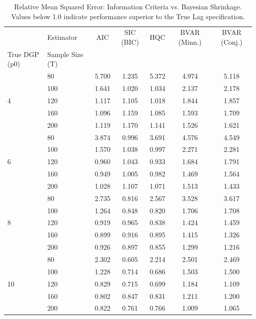 \begin{table}[htbp]
\centering
\caption{Relative Mean Squared Error: Information Criteria vs. Bayesian Shrinkage. Values below 1.0 indicate performance superior to the True Lag specification.}
\label{tab:bvar_vs_ic}
\begin{tabular}{llccccc}
\toprule
 & Estimator & AIC & SIC (BIC) & HQC & BVAR (Minn.) & BVAR (Conj.) \\
True DGP (p0) & Sample Size (T) &  &  &  &  &  \\
\midrule
\multirow[t]{5}{*}{4} & 80 & 5.700 & 1.235 & 5.372 & 4.974 & 5.118 \\
 & 100 & 1.641 & 1.020 & 1.034 & 2.137 & 2.178 \\
 & 120 & 1.117 & 1.105 & 1.018 & 1.844 & 1.857 \\
 & 160 & 1.096 & 1.159 & 1.085 & 1.593 & 1.709 \\
 & 200 & 1.119 & 1.170 & 1.141 & 1.526 & 1.621 \\
\multirow[t]{5}{*}{6} & 80 & 3.874 & 0.996 & 3.691 & 4.576 & 4.549 \\
 & 100 & 1.570 & 1.038 & 0.997 & 2.271 & 2.281 \\
 & 120 & 0.960 & 1.043 & 0.933 & 1.684 & 1.791 \\
 & 160 & 0.949 & 1.005 & 0.982 & 1.469 & 1.564 \\
 & 200 & 1.028 & 1.107 & 1.071 & 1.513 & 1.433 \\
\multirow[t]{5}{*}{8} & 80 & 2.735 & 0.816 & 2.567 & 3.528 & 3.617 \\
 & 100 & 1.264 & 0.848 & 0.820 & 1.706 & 1.708 \\
 & 120 & 0.919 & 0.965 & 0.838 & 1.424 & 1.459 \\
 & 160 & 0.899 & 0.916 & 0.895 & 1.415 & 1.326 \\
 & 200 & 0.926 & 0.897 & 0.855 & 1.299 & 1.216 \\
\multirow[t]{5}{*}{10} & 80 & 2.302 & 0.605 & 2.214 & 2.501 & 2.469 \\
 & 100 & 1.228 & 0.714 & 0.686 & 1.503 & 1.500 \\
 & 120 & 0.829 & 0.715 & 0.699 & 1.184 & 1.109 \\
 & 160 & 0.802 & 0.847 & 0.831 & 1.211 & 1.200 \\
 & 200 & 0.822 & 0.761 & 0.766 & 1.009 & 1.065 \\
\bottomrule
\end{tabular}
\end{table}
